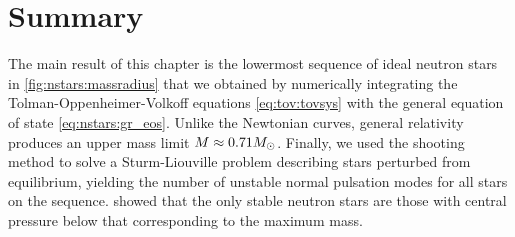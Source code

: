 \section{Summary}

The main result of this chapter is the lowermost sequence of ideal neutron stars in \cref{fig:nstars:massradius} that we obtained by numerically integrating the Tolman-Oppenheimer-Volkoff equations \eqref{eq:tov:tovsys} with the general equation of state \eqref{eq:nstars:gr_eos}.
Unlike the Newtonian curves, general relativity produces an upper mass limit $M \approx 0.71 M_\odot$.
Finally, we used the shooting method to solve a Sturm-Liouville problem describing stars perturbed from equilibrium, yielding the number of unstable normal pulsation modes for all stars on the sequence.
 showed that the only stable neutron stars are those with central pressure below that corresponding to the maximum mass.


